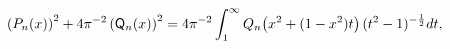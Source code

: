 \[\left(\mathop{P_{n}\/}\nolimits\!\left(x\right)\right)^{2}+4\pi^{-2}\left(%
\mathop{\mathsf{Q}_{n}\/}\nolimits\!\left(x\right)\right)^{2}=4\pi^{-2}\*\int_%
{1}^{\infty}\mathop{Q_{n}\/}\nolimits\!\left(x^{2}+(1-x^{2})t\right)(t^{2}-1)^%
{-\frac{1}{2}}dt,\]